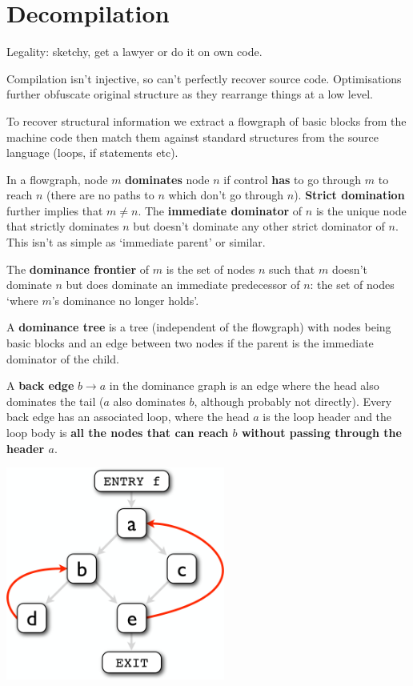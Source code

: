 \documentclass[a4paper, 11pt]{article}
\begin{document}
\section*{Decompilation}
{
    Legality: sketchy, get a lawyer or do it on own code.

    Compilation isn't injective, so can't perfectly recover source code. Optimisations further obfuscate original structure as they rearrange things at a low level.

    To recover structural information we extract a flowgraph of basic blocks from the machine code then match them against standard structures from the source language (loops, if statements etc).

    In a flowgraph, node \(m\) \textbf{dominates} node \(n\) if control \textbf{has} to go through \(m\) to reach \(n\) (there are no paths to \(n\) which don't go through \(n\)). \textbf{Strict domination} further implies that \(m \neq n\). The \textbf{immediate dominator} of \(n\) is the unique node that strictly dominates \(n\) but doesn't dominate any other strict dominator of \(n\). This isn't as simple as `immediate parent' or similar.

    The \textbf{dominance frontier} of \(m\) is the set of nodes \(n\) such that \(m\) doesn't dominate \(n\) but does dominate an immediate predecessor of \(n\): the set of nodes `where \(m\)'s dominance no longer holds'.

    A \textbf{dominance tree} is a tree (independent of the flowgraph) with nodes being basic blocks and an edge between two nodes if the parent is the immediate dominator of the child.

    A \textbf{back edge} \(b \rightarrow a\) in the dominance graph is an edge where the head also dominates the tail (\(a\) also dominates \(b\), although probably not directly). Every back edge has an associated loop, where the head \(a\) is the loop header and the loop body is \textbf{all the nodes that can reach \(b\) without passing through the header \(a\)}.

    \begin{minipage}[t]{0.47\textwidth}
    \centering
    \includegraphics[height=7cm]{flow-graph.png}


\end{minipage}}
\end{document}
